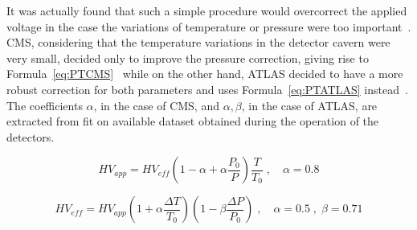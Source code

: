 	It was actually found that such a simple procedure would overcorrect the applied voltage in the case the variations of temperature or pressure were too important~\cite{ABBRESCIA2013,FILIP2014,BIANCO2007,BIANCO2009}. CMS, considering that the temperature variations in the detector cavern were very small, decided only to improve the pressure correction, giving rise to Formula~\ref{eq:PTCMS}~\cite{ABBRESCIA2013} while on the other hand, ATLAS decided to have a more robust correction for both parameters and uses Formula~\ref{eq:PTATLAS} instead~\cite{BIANCO2009}. The coefficients $\alpha$, in the case of CMS, and $\alpha,\beta$, in the case of ATLAS, are extracted from fit on available dataset obtained during the operation of the detectors.
	
	\begin{equation}
	\label{eq:PTCMS}
	HV_{app} = HV_{eff}\left( 1 - \alpha + \alpha\frac{P_0}{P} \right) \frac{T}{T_0} \; , \quad \alpha = 0.8
	\end{equation}
	
	\begin{equation}
	\label{eq:PTATLAS}
	HV_{eff} = HV_{app}\left( 1 + \alpha\frac{\Delta T}{T_0} \right) \left( 1 - \beta\frac{\Delta P}{P_0} \right) \; , \quad \alpha = 0.5 \; , \; \beta = 0.71
	\end{equation}

\clearpage{\pagestyle{empty}\cleardoublepage}
